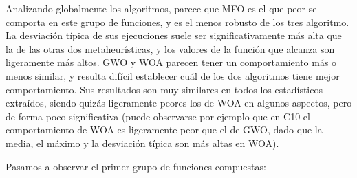 \documentclass[
  a4paper,
,tablecaptionabove
]{scrartcl}
\begin{document}
Analizando globalmente los algoritmos, parece que MFO es el que peor se
comporta en este grupo de funciones, y es el menos robusto de los tres
algoritmo. La desviación típica de sus ejecuciones suele ser
significativamente más alta que la de las otras dos metaheurísticas, y
los valores de la función que alcanza son ligeramente más altos. GWO y
WOA parecen tener un comportamiento más o menos similar, y resulta
difícil establecer cuál de los dos algoritmos tiene mejor
comportamiento. Sus resultados son muy similares en todos los
estadísticos extraídos, siendo quizás ligeramente peores los de WOA en
algunos aspectos, pero de forma poco significativa (puede observarse por
ejemplo que en C10 el comportamiento de WOA es ligeramente peor que el
de GWO, dado que la media, el máximo y la desviación típica son más
altas en WOA).

Pasamos a observar el primer grupo de funciones compuestas:
\end{document}
